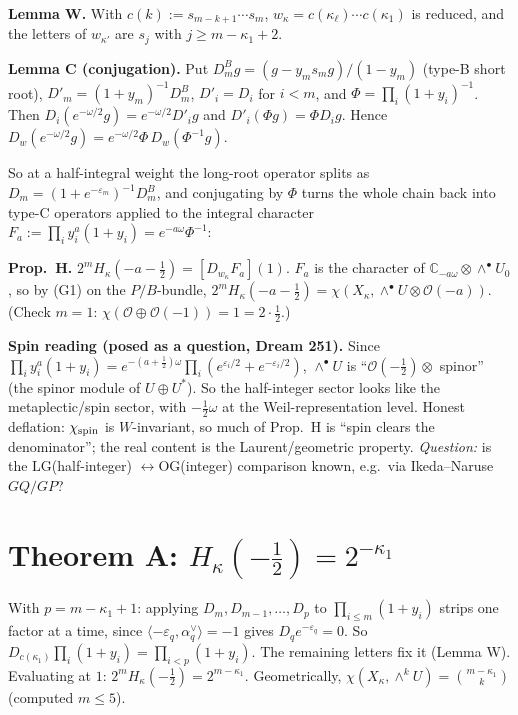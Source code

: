 \documentclass[10pt]{article}
\newcommand{\LG}{\mathrm{LG}}
\newcommand{\OG}{\mathrm{OG}}
\begin{document}
\textbf{Lemma W.} With $c(k):=s_{m-k+1}\cdots s_m$, $w_\kappa=c(\kappa_\ell)\cdots c(\kappa_1)$ is reduced, and the
letters of $w_{\kappa'}$ are $s_j$ with $j\ge m-\kappa_1+2$.

\textbf{Lemma C (conjugation).} Put $D^B_mg=(g-y_ms_mg)/(1-y_m)$ (type-B short root), $D'_m=(1+y_m)^{-1}D^B_m$, $D'_i=D_i$ for $i<m$,
and $\Phi=\prod_i(1+y_i)^{-1}$. Then $D_i(e^{-\omega/2}g)=e^{-\omega/2}D'_ig$ and $D'_i(\Phi g)=\Phi D_ig$. Hence
$D_w(e^{-\omega/2}g)=e^{-\omega/2}\Phi\,D_w(\Phi^{-1}g)$.

So at a half-integral weight the long-root operator splits as $D_m=(1+e^{-\varepsilon_m})^{-1}D^B_m$, and conjugating by $\Phi$
turns the whole chain back into type-C operators applied to the integral character
$F_a:=\prod_iy_i^a(1+y_i)=e^{-a\omega}\Phi^{-1}$:

\textbf{Prop.~H.} $2^mH_\kappa(-a-\frac12)=[D_{w_\kappa}F_a](1)$. $F_a$ is the character of $\mathbb C_{-a\omega}\otimes\wedge^\bullet U_0$,
so by (G1) on the $P/B$-bundle, $2^mH_\kappa(-a-\frac12)=\chi(X_\kappa,\wedge^\bullet U\otimes\mathcal O(-a))$.
(Check $m=1$: $\chi(\mathcal O\oplus\mathcal O(-1))=1=2\cdot\frac12$.)

\textbf{Spin reading (posed as a question, Dream 251).} Since $\prod_iy_i^a(1+y_i)=e^{-(a+\frac12)\omega}\prod_i(e^{\varepsilon_i/2}+e^{-\varepsilon_i/2})$,
$\wedge^\bullet U$ is ``$\mathcal O(-\frac12)\otimes$ spinor'' (the spinor module of $U\oplus U^*$). So the half-integer sector looks
like the metaplectic/spin sector, with $-\frac12\omega$ at the Weil-representation level. Honest deflation: $\chi_{\rm spin}$ is
$W$-invariant, so much of Prop.~H is ``spin clears the denominator''; the real content is the Laurent/geometric property.
\emph{Question:} is the $\LG$(half-integer) $\leftrightarrow\OG$(integer) comparison known, e.g.\ via Ikeda--Naruse $GQ/GP$?

\section{Theorem A: $H_\kappa(-\tfrac12)=2^{-\kappa_1}$}

With $p=m-\kappa_1+1$: applying $D_m,D_{m-1},\dots,D_p$ to $\prod_{i\le m}(1+y_i)$ strips one factor at a time, since
$\langle-\varepsilon_q,\alpha_q^\vee\rangle=-1$ gives $D_qe^{-\varepsilon_q}=0$. So $D_{c(\kappa_1)}\prod_i(1+y_i)=\prod_{i<p}(1+y_i)$.
The remaining letters fix it (Lemma W). Evaluating at $1$: $2^mH_\kappa(-\frac12)=2^{m-\kappa_1}$. Geometrically,
$\chi(X_\kappa,\wedge^kU)=\binom{m-\kappa_1}{k}$ (computed $m\le5$).
\end{document}
